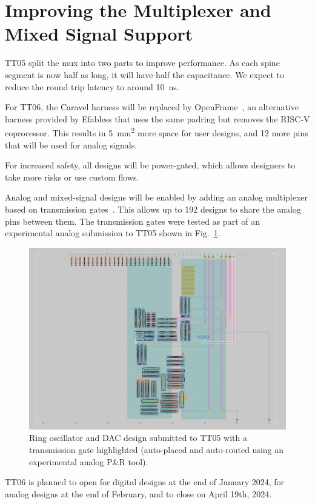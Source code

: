 \section{Improving the Multiplexer and Mixed Signal Support}
\label{sec:improving}

TT05 split the mux into two parts to improve performance.
As each spine segment is now half as long, it will have half the capacitance.
We expect to reduce the round trip latency to around \qty{10}{\ns}.

For TT06, the Caravel harness will be replaced by OpenFrame~\cite{openframe}, an alternative harness provided by Efabless that uses the same padring but removes the RISC-V coprocessor.
This results in \qty{5}{\mm\squared} more space for user designs, and 12 more pins that will be used for analog signals.

For increased safety, all designs will be power-gated, which allows designers to take more risks or use custom flows.

Analog and mixed-signal designs will be enabled by adding an analog multiplexer based on transmission gates~\cite{transmissiongates}. 
This allows up to 192 designs to share the analog pins between them.
The transmission gates were tested as part of an experimental analog submission to TT05 shown in Fig.~\ref{fig:transmission_gate_TT05}.

\begin{figure}[!t]
\centering
\includegraphics[width=\columnwidth]{./Figs/tt05_transmission_gate.png}
\caption{Ring oscillator and DAC design submitted to TT05 with a transmission gate highlighted (auto-placed and auto-routed using an experimental analog P\&R tool).}
\label{fig:transmission_gate_TT05}
\end{figure}

TT06 is planned to open for digital designs at the end of January 2024, for analog designs at the end of February, and to close on April 19th, 2024.
